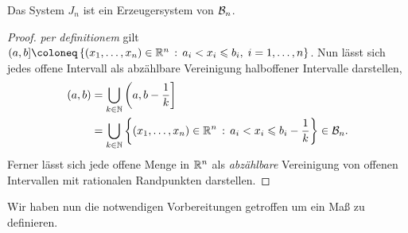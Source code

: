 \begin{prop}
\label{prop:1.1}
Das System $J_n$ ist ein Erzeugersystem von $\mathcal{B}_n$.\fishhere
\end{prop}
\begin{proof}
\textit{per definitionem} gilt
$(a,b] \defl \setdef{(x_1,\ldots,x_n)\in\R^n}{a_i < x_i\le b_i,\;
i=1,\ldots,n}$. Nun lässt sich jedes offene Intervall als abzählbare
Vereinigung halboffener Intervalle darstellen,
\begin{align*}
(a,b) &= \bigcup_{k\in\mathbb{N}} \left(a,b-\frac{1}{k}\right] \\ &=
\bigcup_{k\in\mathbb{N}} \left\{ (x_1,\ldots,x_n)\in\mathbb{R}^n\,:\,a_i< x_i \leqslant  b_i-\frac{1}{k}\right\}
\in \mathcal{B}_n.
\end{align*}
Ferner lässt sich jede offene Menge in $\mathbb{R}^n$ als \textit{abzählbare}
Vereinigung von offenen Intervallen mit rationalen Randpunkten
darstellen.\qedhere
\end{proof}

Wir haben nun die notwendigen Vorbereitungen getroffen um ein Maß zu
definieren.

